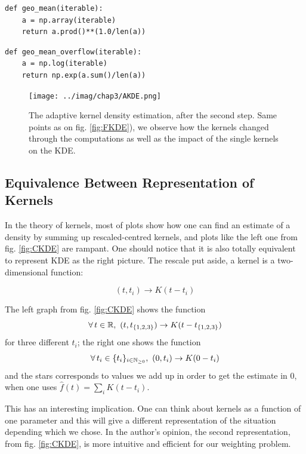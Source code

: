 \documentclass[11pt]{book}
\newcommand{\sequence}[1]{\{ #1 \}_{ i \in \N} }
\begin{document}
\begin{verbatim}
def geo_mean(iterable):
    a = np.array(iterable)
    return a.prod()**(1.0/len(a))
\end{verbatim}    
\begin{verbatim}
def geo_mean_overflow(iterable):
    a = np.log(iterable)
    return np.exp(a.sum()/len(a))
\end{verbatim}



\begin{figure}
\centering
\texttt{[image: ../imag/chap3/AKDE.png]}
\caption{The adaptive kernel density estimation, after the second step. Same points as on fig. \ref{fig:FKDE}), we observe how the kernels changed through the computations as well as the impact of the single kernels on the KDE.}
\end{figure}







\subsection{Equivalence Between Representation of Kernels}
\label{section:equivalence_bi_rep}

In the theory of kernels, most of plots show how one can find an estimate of a density by summing up rescaled-centred kernels, and plots like the left one from fig. \ref{fig:CKDE} are rampant. One should notice that it is also totally equivalent to represent KDE as the right picture. The rescale put aside, a kernel is a two-dimensional function: 

\begin{equation*}
(t,t_i) \to K(t - t_i) 
\end{equation*}

The left graph from fig. \ref{fig:CKDE} shows the function 
$$ \forall t \in \R, \ (t,t_{ \{1,2,3 \} }) \to K(t- t_{ \{1,2,3 \} }) $$ 
for three different $t_i$; the right one shows the function
$$ \forall t_i \in \sequence{ t_i }, \ (0,t_i ) \to K(0 - t_i) $$ 
and the stars corresponds to values we add up in order to get the estimate in $0$, when one uses $\hat{f}(t) = \sum_i K(t-t_i)$. 

This has an interesting implication. One can think about kernels as a function of one parameter and this will give a different representation of the situation depending which we chose. In the author's opinion, the second representation, from fig. \ref{fig:CKDE}, is more intuitive and efficient for our weighting problem. 
\end{document}
